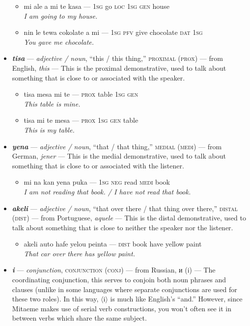 \documentclass[a4paper, titlepage]{article}
\begin{document}
\begin{itemize}
	\begin{itemize}
		\item mi ale a mi te kasa — \textsc{1sg} go \textsc{loc 1sg gen} house \\\textit{I am going to my house.}
		\item nin le tewa cokolate a mi — \textsc{1sg pfv} give chocolate \textsc{dat 1sg} \\\textit{You gave me chocolate.}
	\end{itemize}
	\item \textbf{\textit{tisa}} — \textit{adjective / noun}, ``this / this thing,'' \textsc{proximal (prox)} — from English, \textit{this} — This is the proximal demonstrative, used to talk about something that is close to or associated with the speaker.
	\begin{itemize}
		\item tisa mesa mi te — \textsc{prox} table \textsc{1sg gen} \\\textit{This table is mine.}
		\item tisa mi te mesa — \textsc{prox 1sg gen} table \\\textit{This is my table.}
	\end{itemize}
	\item \textbf{\textit{yena}} — \textit{adjective / noun}, ``that / that thing,'' \textsc{medial (medi)}  — from German, \textit{jener} — This is the medial demonstrative, used to talk about something that is close to or associated with the listener.
	\begin{itemize}
		\item mi na kan yena puka — \textsc{1sg neg} read \textsc{medi} book \\\textit{I am not reading that book. / I have not read that book.}
	\end{itemize}
	\item \textbf{\textit{akeli}} — \textit{adjective / noun}, ``that over there / that thing over there,'' \textsc{distal (dist)}  — from Portuguese, \textit{aquele} — This is the distal demonstrative, used to talk about something that is close to neither the speaker nor the listener.
	\begin{itemize}
		\item akeli auto hafe yelou peinta — \textsc{dist} book have yellow paint \\\textit{That car over there has yellow paint.}
	\end{itemize}
	\item \textbf{\textit{i}} — \textit{conjunction}, \textsc{conjunction (conj)}  — from Russian, и (i) — The coordinating conjunction, this serves to conjoin both noun phrases and clauses (unlike in some languages where separate conjunctions are used for these two roles). In this way, $\langle$i$\rangle$ is much like English's ``and.'' However, since Mitaeme makes use of serial verb constructions, you won't often see it in between verbs which share the same subject.

\end{itemize}
\end{document}
